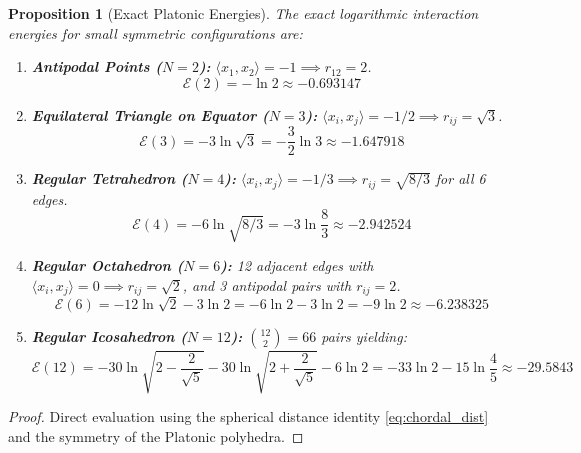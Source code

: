 \documentclass[11pt,a4paper]{article}
\newtheorem{proposition}[theorem]{Proposition}
\theoremstyle{definition}
\begin{document}
\begin{proposition}[Exact Platonic Energies]\label{prop:platonic_energies}
The exact logarithmic interaction energies for small symmetric configurations are:
\begin{enumerate}
    \item \textbf{Antipodal Points ($N = 2$):} $\langle x_1, x_2 \rangle = -1 \implies r_{12} = 2$.
    \begin{equation}\label{eq:e2_val}
    \mathcal{E}(2) = -\ln 2 \approx -0.693147
    \end{equation}
    
    \item \textbf{Equilateral Triangle on Equator ($N = 3$):} $\langle x_i, x_j \rangle = -1/2 \implies r_{ij} = \sqrt{3}$.
    \begin{equation}\label{eq:e3_val}
    \mathcal{E}(3) = -3 \ln \sqrt{3} = -\frac{3}{2} \ln 3 \approx -1.647918
    \end{equation}
    
    \item \textbf{Regular Tetrahedron ($N = 4$):} $\langle x_i, x_j \rangle = -1/3 \implies r_{ij} = \sqrt{8/3}$ for all 6 edges.
    \begin{equation}\label{eq:e4_val}
    \mathcal{E}(4) = -6 \ln \sqrt{8/3} = -3 \ln \frac{8}{3} \approx -2.942524
    \end{equation}
    
    \item \textbf{Regular Octahedron ($N = 6$):} 12 adjacent edges with $\langle x_i, x_j \rangle = 0 \implies r_{ij} = \sqrt{2}$, and 3 antipodal pairs with $r_{ij} = 2$.
    \begin{equation}\label{eq:e6_val}
    \mathcal{E}(6) = -12 \ln \sqrt{2} - 3 \ln 2 = -6 \ln 2 - 3 \ln 2 = -9 \ln 2 \approx -6.238325
    \end{equation}
    
    \item \textbf{Regular Icosahedron ($N = 12$):} $\binom{12}{2} = 66$ pairs yielding:
    \begin{equation}\label{eq:e12_val}
    \mathcal{E}(12) = -30 \ln \sqrt{2 - \frac{2}{\sqrt{5}}} - 30 \ln \sqrt{2 + \frac{2}{\sqrt{5}}} - 6 \ln 2 = -33 \ln 2 - 15 \ln \frac{4}{5} \approx -29.5843
    \end{equation}
\end{enumerate}
\end{proposition}

\begin{proof}
Direct evaluation using the spherical distance identity \eqref{eq:chordal_dist} and the symmetry of the Platonic polyhedra.
\end{proof}
\end{document}

